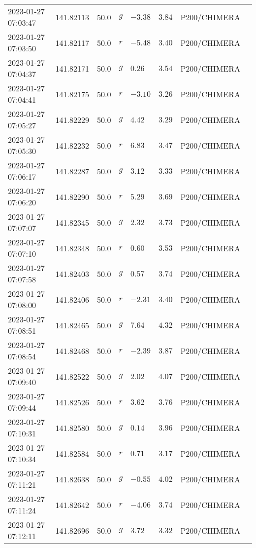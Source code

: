 \documentclass{nature_plusfigure}
\begin{document}
\begin{supplement}
\begin{center}
\begin{longtable}{llllllll}
2023-01-27 07:03:47 & 141.82113 & 50.0 & $g$ & $-3.38$ & $3.84$ & P200/CHIMERA &  \\ 
2023-01-27 07:03:50 & 141.82117 & 50.0 & $r$ & $-5.48$ & $3.40$ & P200/CHIMERA &  \\ 
2023-01-27 07:04:37 & 141.82171 & 50.0 & $g$ & $0.26$ & $3.54$ & P200/CHIMERA &  \\ 
2023-01-27 07:04:41 & 141.82175 & 50.0 & $r$ & $-3.10$ & $3.26$ & P200/CHIMERA &  \\ 
2023-01-27 07:05:27 & 141.82229 & 50.0 & $g$ & $4.42$ & $3.29$ & P200/CHIMERA &  \\ 
2023-01-27 07:05:30 & 141.82232 & 50.0 & $r$ & $6.83$ & $3.47$ & P200/CHIMERA &  \\ 
2023-01-27 07:06:17 & 141.82287 & 50.0 & $g$ & $3.12$ & $3.33$ & P200/CHIMERA &  \\ 
2023-01-27 07:06:20 & 141.82290 & 50.0 & $r$ & $5.29$ & $3.69$ & P200/CHIMERA &  \\ 
2023-01-27 07:07:07 & 141.82345 & 50.0 & $g$ & $2.32$ & $3.73$ & P200/CHIMERA &  \\ 
2023-01-27 07:07:10 & 141.82348 & 50.0 & $r$ & $0.60$ & $3.53$ & P200/CHIMERA &  \\ 
2023-01-27 07:07:58 & 141.82403 & 50.0 & $g$ & $0.57$ & $3.74$ & P200/CHIMERA &  \\ 
2023-01-27 07:08:00 & 141.82406 & 50.0 & $r$ & $-2.31$ & $3.40$ & P200/CHIMERA &  \\ 
2023-01-27 07:08:51 & 141.82465 & 50.0 & $g$ & $7.64$ & $4.32$ & P200/CHIMERA &  \\ 
2023-01-27 07:08:54 & 141.82468 & 50.0 & $r$ & $-2.39$ & $3.87$ & P200/CHIMERA &  \\ 
2023-01-27 07:09:40 & 141.82522 & 50.0 & $g$ & $2.02$ & $4.07$ & P200/CHIMERA &  \\ 
2023-01-27 07:09:44 & 141.82526 & 50.0 & $r$ & $3.62$ & $3.76$ & P200/CHIMERA &  \\ 
2023-01-27 07:10:31 & 141.82580 & 50.0 & $g$ & $0.14$ & $3.96$ & P200/CHIMERA &  \\ 
2023-01-27 07:10:34 & 141.82584 & 50.0 & $r$ & $0.71$ & $3.17$ & P200/CHIMERA &  \\ 
2023-01-27 07:11:21 & 141.82638 & 50.0 & $g$ & $-0.55$ & $4.02$ & P200/CHIMERA &  \\ 
2023-01-27 07:11:24 & 141.82642 & 50.0 & $r$ & $-4.06$ & $3.74$ & P200/CHIMERA &  \\ 
2023-01-27 07:12:11 & 141.82696 & 50.0 & $g$ & $3.72$ & $3.32$ & P200/CHIMERA &  \\ 

\end{longtable}
\end{center}
\end{supplement}
\end{document}
